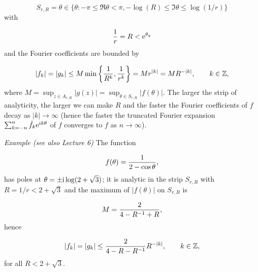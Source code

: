 \documentclass[12pt,a4paper]{article}
\def\I{ {\rm i} }
\def\E{ {\rm e} }
\begin{document}
\[
S_{r,R} = \theta \in    \lbrace \theta : -\pi \leq \Re  \theta < \pi,  -\log(R) \leq \Im \theta \leq \log(1/r) \rbrace
\]
with

\[
{1 \over r} = R < \E^{\theta_y}
\]
and the Fourier coefficients are bounded by

\[
|f_k | = |g_k |  \leq M\min\left\{{1 \over R^k} , {1 \over r^k}\right\} = M r^{|k|} = M R^{-|k|}, \qquad k \in \mathbb{Z},
\]
where $M = \sup_{z \in  A_{r,R}} |g(z)| = \sup_{\theta \in  S_{r,R}} |f(\theta)|$. The larger the strip of analyticity, the larger we can make $R$ and the faster the Fourier coefficients of $f$ decay as $\vert k \vert \to \infty$ (hence the faster the truncated Fourier expansion $\sum_{k=-n}^{n}\hat f_k \E^{i k \theta}$ of $f$ converges to $f$ as $n \to \infty$).

\emph{Example (see also Lecture 6)} The function

\[
 f(\theta) = {1 \over 2 - \cos\theta},
\]
has poles at $\theta = \pm \I \log (2 + \sqrt{3})$; it is analytic in the strip $S_{r,R}$ with $R = 1/r < 2 + \sqrt{3}$ and the maximum of $\vert f(\theta) \vert$ on $S_{r,R}$ is

\[
M = {2 \over 4 - R^{-1} + R},
\]
hence

\[
|f_k| =     |g_k| \leq {2 \over 4 - R -R^{-1}} R^{-\vert k \vert}, \qquad k \in \mathbb{Z},
\]
for all $R < 2 + \sqrt{3}$.
\end{document}
